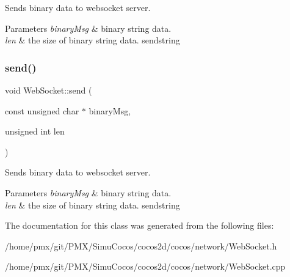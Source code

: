 Sends binary data to websocket server. 


\begin{DoxyParams}{Parameters}
{\em binary\+Msg} & binary string data. \\
\hline
{\em len} & the size of binary string data.  sendstring \\
\hline
\end{DoxyParams}
\mbox{\label{classnetwork_1_1WebSocket_aa13070e6df2d71b315207c016c6ec206}} 
\subsubsection{\texorpdfstring{send()}{send()}\hspace{0.1cm}{\footnotesize\ttfamily [4/4]}}
{\footnotesize\ttfamily void Web\+Socket\+::send (\begin{DoxyParamCaption}\item[{const unsigned char $\ast$}]{binary\+Msg,  }\item[{unsigned int}]{len }\end{DoxyParamCaption})}



Sends binary data to websocket server. 


\begin{DoxyParams}{Parameters}
{\em binary\+Msg} & binary string data. \\
\hline
{\em len} & the size of binary string data.  sendstring \\
\hline
\end{DoxyParams}


The documentation for this class was generated from the following files\+:\begin{DoxyCompactItemize}
\item 
/home/pmx/git/\+P\+M\+X/\+Simu\+Cocos/cocos2d/cocos/network/Web\+Socket.\+h\item 
/home/pmx/git/\+P\+M\+X/\+Simu\+Cocos/cocos2d/cocos/network/Web\+Socket.\+cpp\end{DoxyCompactItemize}
